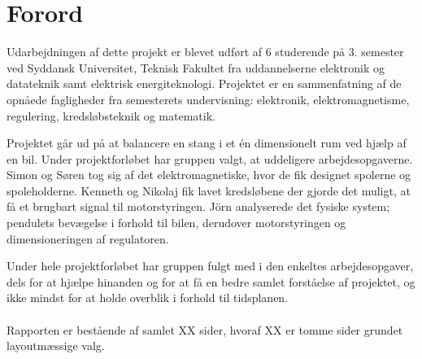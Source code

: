 \section{Forord}\label{sec:forord}
Udarbejdningen af dette projekt er blevet udført af 6 studerende på 3. semester ved Syddansk Universitet, Teknisk Fakultet fra uddannelserne elektronik og datateknik samt elektrisk energiteknologi.
Projektet er en sammenfatning af de opnåede fagligheder fra semesterets undervisning: elektronik, elektromagnetisme, regulering, kredsløbsteknik og matematik.

Projektet går ud på at balancere en stang i et én dimensionelt rum ved hjælp af en bil. Under projektforløbet har gruppen valgt, at uddeligere arbejdesopgaverne. Simon og Søren tog sig af det elektromagnetiske, hvor de fik designet spolerne og spoleholderne. Kenneth og Nikolaj fik lavet kredsløbene der gjorde det muligt, at få et brugbart signal til motorstyringen. Jörn analyserede det fysiske system; pendulets bevægelse i forhold til bilen, derudover motorstyringen og dimensioneringen af regulatoren.

Under hele projektforløbet har gruppen fulgt med i den enkeltes arbejdesopgaver, dels for at hjælpe hinanden og for at få en bedre samlet forståelse af projektet, og ikke mindst for at holde overblik i forhold til tidsplanen. 
\\ \\
Rapporten er bestående af samlet XX sider, hvoraf XX er tomme sider grundet layoutmæssige valg. 